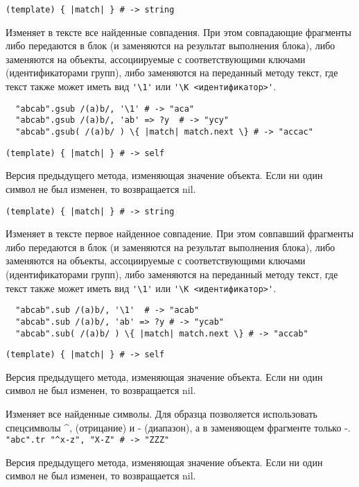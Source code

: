 \begin{methodlist}
  \verb!(template) { |match| } # -> string!

  Изменяет в тексте все найденные совпадения. При этом совпадающие фрагменты либо передаются в блок (и заменяются на результат выполнения блока), либо заменяются на объекты, ассоциируемые с соответствующими ключами (идентификаторами групп), либо заменяются на переданный методу текст, где текст также может иметь вид \verb!'\1'! или \verb!'\K <идентификатор>'!.
  \begin{verbatim}
  "abcab".gsub /(a)b/, '\1' # -> "aca"
  "abcab".gsub /(a)b/, 'ab' => ?y  # -> "ycy"
  "abcab".gsub( /(a)b/ ) \{ |match| match.next \} # -> "accac"
  \end{verbatim}

  \verb!(template) { |match| } # -> self!

  Версия предыдущего метода, изменяющая значение объекта. Если ни один символ не был изменен, то возвращается nil.

  \verb!(template) { |match| } # -> string!

  Изменяет в тексте первое найденное совпадение. При этом совпавший фрагменты либо передаются в блок (и заменяются на результат выполнения блока), либо заменяются на объекты, ассоциируемые с соответствующими ключами (идентификаторами групп), либо заменяются на переданный методу текст, где текст также может иметь вид \verb!'\1'! или \verb!'\K <идентификатор>'!.
  \begin{verbatim}
  "abcab".sub /(a)b/, '\1'  # -> "acab"
  "abcab".sub /(a)b/, 'ab' => ?y # -> "ycab"
  "abcab".sub( /(a)b/ ) \{ |match| match.next \} # -> "accab"
  \end{verbatim}

  \verb!(template) { |match| } # -> self!

  Версия предыдущего метода, изменяющая значение объекта. Если ни один символ не был изменен, то возвращается nil.

  Изменяет все найденные символы. Для образца позволяется использовать спецсимволы \textasciicircum\-, (отрицание) и - (диапазон), а в заменяющем фрагменте только -.
  \\\verb!"abc".tr "^x-z", "X-Z" # -> "ZZZ"!

  Версия предыдущего метода, изменяющая значение объекта. Если ни один символ не был изменен, то возвращается nil.


\end{methodlist}

